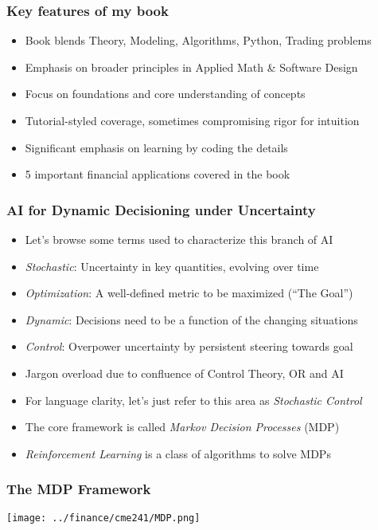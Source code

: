 \documentclass[handout]{beamer}
\begin{document}
\begin{frame}
\frametitle{Key features of my book}
\pause
\begin{itemize}[<+->]
\item Book blends Theory, Modeling, Algorithms, Python, Trading problems
\item Emphasis on broader principles in Applied Math \& Software Design
\item Focus on foundations and core understanding of concepts
\item Tutorial-styled coverage, sometimes compromising rigor for intuition
\item Significant emphasis on learning by coding the details
\item 5 important financial applications covered in the book
\end{itemize}
\end{frame}

\begin{frame}
\frametitle{AI for Dynamic Decisioning under Uncertainty}
\pause
\begin{itemize}[<+->]
\item Let's browse some terms used to characterize this branch of AI
\item {\em Stochastic}: Uncertainty in key quantities, evolving over time
\item {\em Optimization}: A well-defined metric to be maximized (``The Goal'')
\item {\em Dynamic}:  Decisions need to be a function of the changing situations
\item {\em Control}: Overpower uncertainty by persistent steering towards goal
\item Jargon overload due to confluence of Control Theory, OR and AI
\item For language clarity, let's just refer to this area as {\em Stochastic Control}
\item The core framework is called {\em Markov Decision Processes} (MDP)
\item {\em Reinforcement Learning} is a class of algorithms to solve MDPs
\end{itemize}
\end{frame}



\begin{frame}
\frametitle{The MDP Framework}
\texttt{[image: ../finance/cme241/MDP.png]}
\end{frame}
\end{document}
